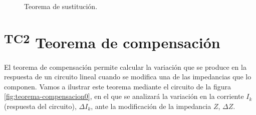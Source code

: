 \begin{figure}[H]
  \centering
  \\
  \hspace{2cm}
  \caption{Teorema de sustitución.}
  \label{fig:teorema-sustitucion}
\end{figure}



\section{\textsuperscript{TC2} Teorema de compensación}
\label{sec:orgea27890}

El teorema de compensación permite calcular la variación que se produce en la respuesta de un circuito lineal cuando se modifica una de las impedancias que lo componen. Vamos a ilustrar este teorema mediante el circuito de la figura \ref{fig:teorema-compensacion0}, en el que se analizará la variación en la corriente $I_k$ (respuesta del circuito), $\Delta I_k$, ante la modificación de la impedancia $Z$, $\Delta Z$.


